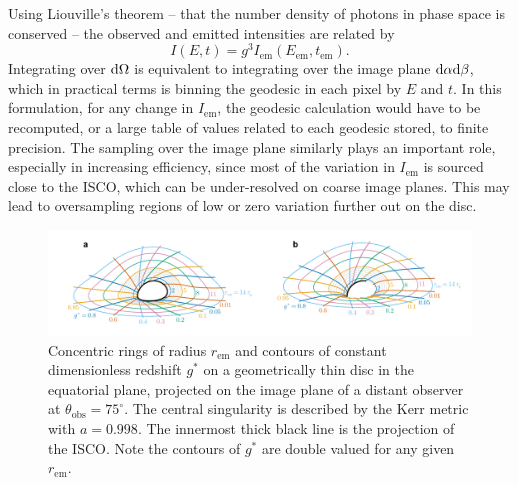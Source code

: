 Using Liouville's theorem -- that the number density of photons in phase space is conserved -- the observed and emitted intensities are related by
\begin{equation}
    I\left( E, t \right) = g^3 I_\text{em}\left(E_\text{em}, t_\text{em}\right).
\end{equation}
Integrating over $\text{d} \Omega$ is equivalent to integrating over the image plane $\text{d} \alpha \text{d} \beta$, which in practical terms is binning the geodesic in each pixel by $E$ and $t$. In this formulation, for any change in $I_\text{em}$, the geodesic calculation would have to be recomputed, or a large table of values related to each geodesic stored, to finite precision. The sampling over the image plane similarly plays an important role, especially in increasing efficiency, since most of the variation in $I_\text{em}$ is sourced close to the ISCO, which can be under-resolved on coarse image planes. This may lead to oversampling regions of low or zero variation further out on the disc.

\begin{figure}
    \centering
    \includegraphics[width=0.95\linewidth]{figures/transfer-function.parameterization.pdf}
    \caption{Concentric rings of radius $r_\text{em}$ and contours of constant dimensionless redshift $g^\ast$ on a geometrically thin disc in the equatorial plane, projected on the image plane of a distant observer at $\theta_\text{obs} = 75^\circ$. The central singularity is described by the Kerr metric with $a = 0.998$. The innermost thick black line is the projection of the ISCO. Note the contours of $g^\ast$ are double valued for any given $r_\text{em}$. }
    \label{fig:transfer-parameterisation}
\end{figure}

